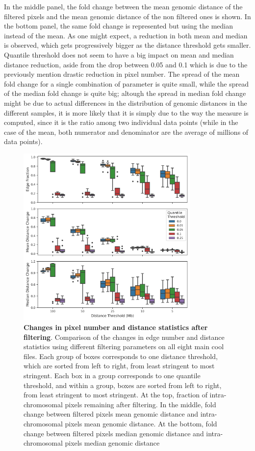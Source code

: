 In the middle panel, the fold change between the mean genomic distance of the filtered pixels and the mean genomic distance of the non filtered ones is shown. In the bottom panel, the same fold change is represented but using the median instead of the mean. As one might expect, a reduction in both mean and median is observed, which gets progressively bigger as the distance threshold gets smaller. Quantile threshold does not seem to have a big impact on mean and median distance reduction, aside from the drop between 0.05 and 0.1 which is due to the previously mention drastic reduction in pixel number. The spread of the mean fold change for a single combination of parameter is quite small, while the spread of the median fold change is quite big; altough the spread in median fold change might be due to actual differences in the distribution of genomic distances in the different samples, it is more likely that it is simply due to the way the measure is computed, since it is the ratio among two individual data points (while in the case of the mean, both numerator and denominator are the average of millions of data points).

\begin{figure}[ht]
  \centering
  \includegraphics[width=0.8\textwidth]{filtering_stats.png}
  \caption{\textbf{Changes in pixel number and distance statistics after filtering}. Comparison of the changes in edge number and distance statistics using different filtering parameters on all eight main cool files. Each group of boxes corresponds to one distance threshold, which are sorted from left to right, from least stringent to most stringent. Each box in a group corresponds to one quantile threshold, and within a group, boxes are sorted from left to right, from least stringent to most stringent. At the top, fraction of intra-chromosomal pixels remaining after filtering. In the middle, fold change between filtered pixels mean genomic distance and intra-chromosomal pixels mean genomic distance. At the bottom, fold change between filtered pixels median genomic distance and intra-chromosomal pixels median genomic distance}
  \label{fig:filtering}
\end{figure}

